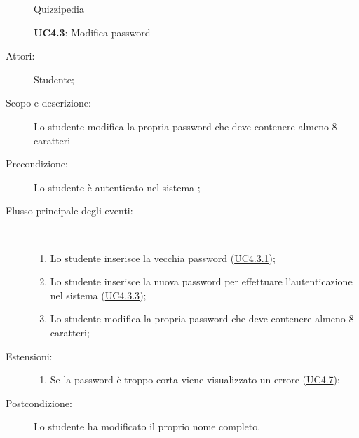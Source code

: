 \begin{figure}[H]
	\centering
	\begin{resizedtikzpicture}{\textwidth}
		\begin{umlsystem}[x=0, fill=lightgray!20]{Quizzipedia}
		\end{umlsystem}
	\end{resizedtikzpicture}
	\caption{\textbf{UC4.3}: Modifica password}
	\label{UC4.3}
\end{figure}
\begin{description}
	\item[Attori:] Studente;
	\item[Scopo e descrizione:] Lo studente modifica la propria password che deve contenere almeno 8 caratteri
	\item[Precondizione:] Lo studente è autenticato nel sistema
	;
	
	\item[Flusso principale degli eventi:] \ 
	\begin{enumerate}
		\item Lo studente inserisce la vecchia password (\hyperlink{UC4.3.1}{UC4.3.1});
		\item Lo studente inserisce la nuova password per effettuare l'autenticazione nel sistema (\hyperlink{UC4.3.3}{UC4.3.3});
		\item Lo studente modifica la propria password che deve contenere almeno 8 caratteri;
		
	\end{enumerate}
	\item[Estensioni:]
	\begin{enumerate}
		\item Se la password è troppo corta viene visualizzato un errore	 (\hyperlink{UC4.7}{UC4.7});
		
	\end{enumerate}
	\item[Postcondizione:] Lo studente ha modificato il proprio nome completo.
\end{description}
\hypertarget{UC4.3.1}{}
